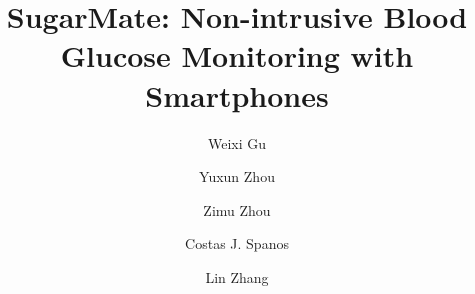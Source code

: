 \documentclass[acmlarge]{acmart}
\newcommand{\sysname}{SugarMate\xspace}
\newcommand{\modelname}{Md$^3$RNN\xspace}
\begin{document}
\title{SugarMate: Non-intrusive Blood Glucose Monitoring with Smartphones}

\author{Weixi Gu}
\author{Yuxun Zhou}
\author{Zimu Zhou}
%

\author{Costas J. Spanos}

\author{Lin Zhang}

\end{document}
